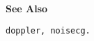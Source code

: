 {\bf \large {}\selectfont See Also}\\
\hspace*{1.5cm}
\begin{minipage}[t]{13.5cm}
\begin{verbatim}
doppler, noisecg.
\end{verbatim}
\end{minipage}
